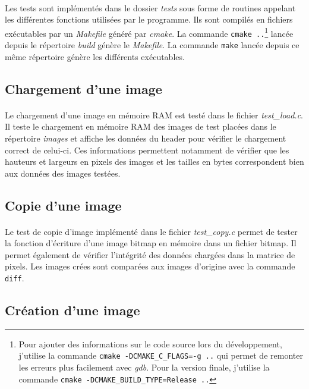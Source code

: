 \documentclass{article}
\begin{document}
    \paragraph{}
    Les tests sont implémentés dans le dossier \emph{tests} sous forme de routines appelant les différentes fonctions utilisées par le programme. Ils sont compilés en fichiers exécutables par un \emph{Makefile} généré par \emph{cmake}. La commande \texttt{cmake ..}\footnote{Pour ajouter des informations sur le code source lors du développement, j'utilise la commande \texttt{cmake -DCMAKE\_C\_FLAGS=-g ..} qui permet de remonter les erreurs plus facilement avec \emph{gdb}. Pour la version finale, j'utilise la commande \texttt{cmake -DCMAKE\_BUILD\_TYPE=Release ..}} lancée depuis le répertoire \emph{build} génère le \emph{Makefile}. La commande \texttt{make} lancée depuis ce même répertoire génère les différents exécutables.


    \subsection{Chargement d'une image}
    \paragraph{}
    Le chargement d'une image en mémoire RAM est testé dans le fichier \emph{test\_load.c}. Il teste le chargement en mémoire RAM des images de test placées dans le répertoire \emph{images} et affiche les données du header pour vérifier le chargement correct de celui-ci. Ces informations permettent notamment de vérifier que les hauteurs et largeurs en pixels des images et les tailles en bytes correspondent bien aux données des images testées.

    \subsection{Copie d'une image}
    \paragraph{}
    Le test de copie d'image implémenté dans le fichier \emph{test\_copy.c} permet de tester la fonction d'écriture d'une image bitmap en mémoire dans un fichier bitmap. Il permet également de vérifier l'intégrité des données chargées dans la matrice de pixels. Les images crées sont comparées aux images d'origine avec la commande \texttt{diff}.


    \subsection{Création d'une image}
\end{document}
